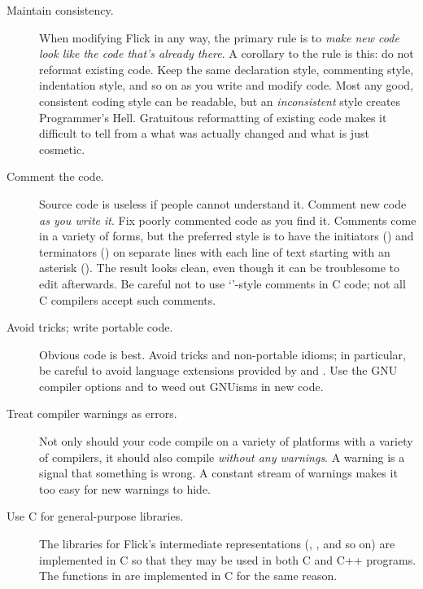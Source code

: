 \begin{description}
  \item[Maintain consistency.]
  When modifying Flick in any way, the primary rule is to \emph{make new code
  look like the code that's already there}.  A corollary to the rule is this:
  do not reformat existing code.  Keep the same declaration style, commenting
  style, indentation style, and so on as you write and modify code.  Most any
  good, consistent coding style can be readable, but an \emph{inconsistent}
  style creates Programmer's Hell.  Gratuitous reformatting of existing code
  makes it difficult to tell from a  what was actually changed
  and what is just cosmetic.

  \item[Comment the code.]
  Source code is useless if people cannot understand it.  Comment new code
  \emph{as you write it}.  Fix poorly commented code as you find it.
  Comments come in a variety of forms, but the preferred style is to have the
  initiators (\cidentifier{/*}) and terminators (\cidentifier{*/}) on separate
  lines with each line of text starting with an asterisk (\cidentifier{*}).
  The result looks clean, even though it can be troublesome to edit afterwards.
  Be careful not to use `\cidentifier{//}'-style comments in C code; not all C
  compilers accept such comments.

  \item[Avoid tricks; write portable code.]
  Obvious code is best.  Avoid tricks and non-portable idioms; in particular,
  be careful to avoid language extensions provided by  and
  .  Use the GNU compiler options  and
   to weed out GNUisms in new code.

  \item[Treat compiler warnings as errors.]
  Not only should your code compile on a variety of platforms with a variety of
  compilers, it should also compile \emph{without any warnings}.  A warning is
  a signal that something is wrong.  A constant stream of warnings makes it too
  easy for new warnings to hide.

  \item[Use C for general-purpose libraries.]
  The libraries for Flick's intermediate representations (\AOI{}, \MINT{}, and
  so on) are implemented in C so that they may be used in both C and C++
  programs.  The functions in  are implemented in C for
  the same reason.


\end{description}
